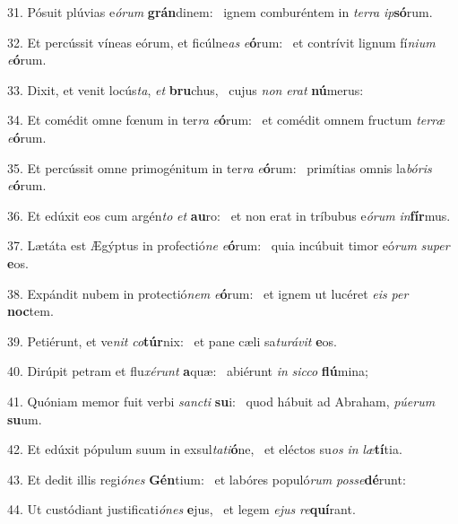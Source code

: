 31. Pósuit plúvias e\textit{ó}\textit{rum} \textbf{grán}dinem: \ast\  ignem comburéntem in \textit{ter}\textit{ra} \textit{ip}\textbf{só}rum.\

32. Et percússit víneas eórum, et ficúlne\textit{as} \textit{e}\textbf{ó}rum: \ast\  et contrívit lignum fí\textit{ni}\textit{um} \textit{e}\textbf{ó}rum.\

33. Dixit, et venit locús\textit{ta}, \textit{et} \textbf{bru}chus, \ast\  cujus \textit{non} \textit{e}\textit{rat} \textbf{nú}merus:\

34. Et comédit omne fœnum in ter\textit{ra} \textit{e}\textbf{ó}rum: \ast\  et comédit omnem fructum \textit{ter}\textit{ræ} \textit{e}\textbf{ó}rum.\

35. Et percússit omne primogénitum in ter\textit{ra} \textit{e}\textbf{ó}rum: \ast\  primítias omnis la\textit{bó}\textit{ris} \textit{e}\textbf{ó}rum.\

36. Et edúxit eos cum argén\textit{to} \textit{et} \textbf{au}ro: \ast\  et non erat in tríbubus e\textit{ó}\textit{rum} \textit{in}\textbf{fír}mus.\

37. Lætáta est Ægýptus in profectió\textit{ne} \textit{e}\textbf{ó}rum: \ast\  quia incúbuit timor eó\textit{rum} \textit{su}\textit{per} \textbf{e}os.\

38. Expándit nubem in protectió\textit{nem} \textit{e}\textbf{ó}rum: \ast\  et ignem ut lucéret \textit{e}\textit{is} \textit{per} \textbf{noc}tem.\

39. Petiérunt, et ve\textit{nit} \textit{co}\textbf{túr}nix: \ast\  et pane cæli sa\textit{tu}\textit{rá}\textit{vit} \textbf{e}os.\

40. Dirúpit petram et flu\textit{xé}\textit{runt} \textbf{a}quæ: \ast\  abiérunt \textit{in} \textit{sic}\textit{co} \textbf{flú}mina;\

41. Quóniam memor fuit verbi \textit{sanc}\textit{ti} \textbf{su}i: \ast\  quod hábuit ad Abraham, \textit{pú}\textit{e}\textit{rum} \textbf{su}um.\

42. Et edúxit pópulum suum in exsul\textit{ta}\textit{ti}\textbf{ó}ne, \ast\  et eléctos su\textit{os} \textit{in} \textit{læ}\textbf{tí}tia.\

43. Et dedit illis regi\textit{ó}\textit{nes} \textbf{Gén}tium: \ast\  et labóres populó\textit{rum} \textit{pos}\textit{se}\textbf{dé}runt:\

44. Ut custódiant justificati\textit{ó}\textit{nes} \textbf{e}jus, \ast\  et legem \textit{e}\textit{jus} \textit{re}\textbf{quí}rant.\


